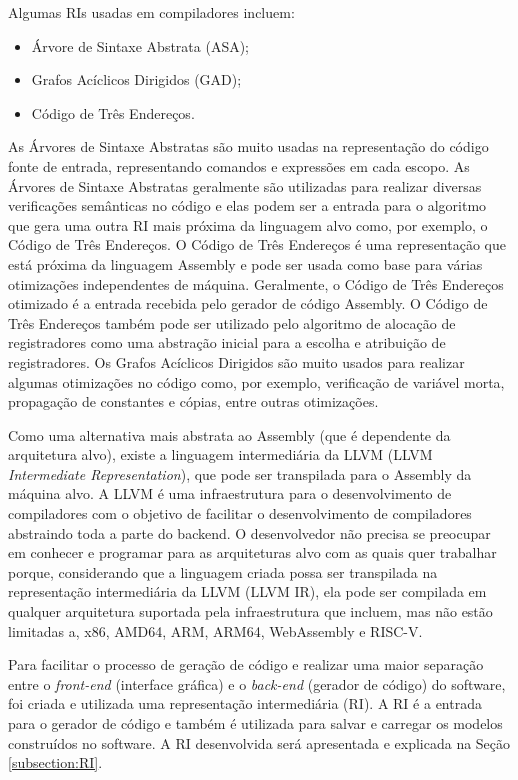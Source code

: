 \documentclass[
	12pt,				%
	openright,			%
	oneside,			%
	a4paper,			%
	main=brazil,
	english,			%
	]{ufsj-abntex2}
\begin{document}
Algumas RIs usadas em compiladores incluem:  
\begin{itemize}
    \item Árvore de Sintaxe Abstrata (ASA); 
    \item Grafos Acíclicos Dirigidos (GAD); 
    \item Código de Três Endereços. 
\end{itemize}

As Árvores de Sintaxe Abstratas são muito usadas na representação do código fonte de entrada, representando comandos e expressões em cada escopo. As Árvores de Sintaxe Abstratas geralmente são utilizadas para realizar diversas verificações semânticas no código e elas podem ser a entrada para o algoritmo que gera uma outra RI mais próxima da linguagem alvo como, por exemplo, o Código de Três Endereços. O Código de Três Endereços é uma representação que está próxima da linguagem Assembly e pode ser usada como base para várias otimizações independentes de máquina. Geralmente, o Código de Três Endereços otimizado é a entrada recebida pelo gerador de código Assembly. O Código de Três Endereços também pode ser utilizado pelo algoritmo de alocação de registradores como uma abstração inicial para a escolha e atribuição de registradores. Os Grafos Acíclicos Dirigidos são muito usados para realizar algumas otimizações no código como, por exemplo, verificação de variável morta, propagação de constantes e cópias, entre outras otimizações. 


Como uma alternativa mais abstrata ao Assembly (que é dependente da arquitetura alvo), existe a linguagem intermediária da LLVM (LLVM \textit{Intermediate Representation}), que pode ser transpilada para o Assembly da máquina alvo. A LLVM é uma infraestrutura para o desenvolvimento de compiladores com o objetivo de facilitar o desenvolvimento de compiladores abstraindo toda a parte do backend. O desenvolvedor não precisa se preocupar em conhecer e programar para as arquiteturas alvo com as quais quer trabalhar porque, considerando que a linguagem criada possa ser transpilada na representação intermediária da LLVM (LLVM IR), ela pode ser compilada em qualquer arquitetura suportada pela infraestrutura que incluem, mas não estão limitadas a, x86, AMD64, ARM, ARM64, WebAssembly e RISC-V.

Para facilitar o processo de geração de código e realizar uma maior separação entre o \textit{front-end} (interface gráfica) e o \textit{back-end} (gerador de código) do software, foi criada e utilizada uma representação intermediária (RI). A RI é a entrada para o gerador de código e também é utilizada para salvar e carregar os modelos construídos no software. A RI desenvolvida será apresentada e explicada na Seção \ref{subsection:RI}.
\end{document}
